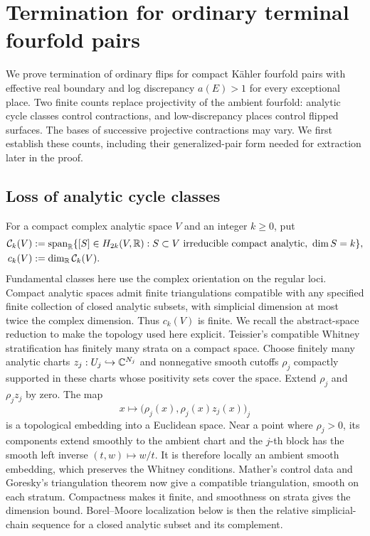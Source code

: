 \section{Termination for ordinary terminal fourfold pairs}\label{sec:counts}

We prove termination of ordinary flips for compact K\"ahler fourfold
pairs with effective real boundary and log discrepancy $a(E)>1$
for every exceptional place.  Two finite counts
replace projectivity of the ambient fourfold: analytic cycle classes
control contractions, and low-discrepancy places control flipped surfaces.
The bases of successive projective contractions may vary.
We first establish these counts, including their generalized-pair form
needed for extraction later in the proof.

\subsection{Loss of analytic cycle classes}

For a compact complex analytic space $V$ and an integer $k\geq 0$, put
\[
 \begin{split}
 \mathcal C_k(V)
 &:=\operatorname{span}_{\mathbb R}\{[S]\in H_{2k}(V,\mathbb R):
                  S\subset V\text{ irreducible compact analytic},\ \dim S=k\},\\
 c_k(V)&:=\dim_{\mathbb R}\mathcal C_k(V).
 \end{split}
\]
Fundamental classes here use the complex orientation on the regular loci.
Compact analytic spaces admit finite triangulations compatible with any
specified finite collection of closed analytic subsets, with simplicial
dimension at most twice the complex dimension.  Thus $c_k(V)$ is finite.
We recall the abstract-space reduction to make the topology used here
explicit.  Teissier's compatible Whitney stratification
\cite[Chapter~III, Propositions~1.5 and~2.2.2]{Teissier1982} has finitely
many strata on a compact space.  Choose finitely many analytic charts
$z_j:U_j\hookrightarrow\mathbb C^{N_j}$ and nonnegative smooth cutoffs
$\rho_j$ compactly supported in these charts whose positivity sets
cover the space.  Extend $\rho_j$ and $\rho_j z_j$ by zero.  The map
\[
 x\longmapsto\bigl(\rho_j(x),\rho_j(x)z_j(x)\bigr)_j
\]
is a topological embedding into a Euclidean space.  Near a point where
$\rho_j>0$, its components extend smoothly to the ambient chart and the
$j$-th block has the smooth left inverse $(t,w)\mapsto w/t$.
It is therefore locally an ambient smooth embedding, which preserves
the Whitney conditions.  Mather's control data
\cite[Section~7, Proposition~7.1, and Section~8]{Mather1970} and
Goresky's triangulation theorem \cite[Section~5]{Goresky1978} now give
a compatible triangulation, smooth on each stratum.  Compactness makes
it finite, and smoothness on strata gives the dimension bound.
Borel--Moore localization below is then the relative simplicial-chain
sequence for a closed analytic subset and its complement.

